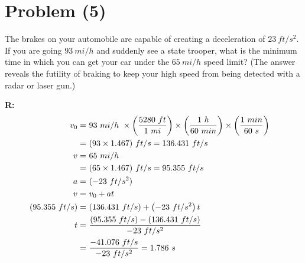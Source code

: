 \section{Problem (5)}
	The brakes on your automobile are capable of creating a deceleration of $23 \ ft/s^{2}$. If you are going $93 \ mi/h$ and suddenly see a state trooper, what is the minimum time in which you can get your car under the $65 \ mi/h$ speed limit? (The answer reveals the futility of braking to keep your high speed from being detected with a radar or laser gun.)

	\textbf{R:} \newline
	\begin{align}
		v_{0} = \ &93 \ mi/h \ \times
		\left( \frac{5280 \ ft}{1 \ mi} \right) \times
		\left( \frac{1 \ h}{60 \ min} \right) \times
		\left( \frac{1 \ min}{60 \ s} \right)
		& \notag \\
		= \ &(93 \times 1.467) \ ft/s = 136.431 \ ft/s& \notag \\
		v = \ &65 \ mi/h& \notag \\
		= \ &(65 \times 1.467) \ ft/s = 95.355 \ ft/s& \notag \\
		a = \ &(- 23 \ ft/s^{2}) \notag \\
		v = \ &v_{0} + at& \notag \\
		(95.355 \ ft/s) = \ &(136.431 \ ft/s) + \left( -23 \ ft/s^{2} \right) t& \notag \\
		t = \ &\frac{(95.355 \ ft/s) - (136.431 \ ft/s)}{-23 \ ft/s^{2}}& \notag \\
		= \ &\frac{-41.076 \ ft/s}{-23 \ ft/s^{2}} = 1.786 \ s&
	\end{align}
